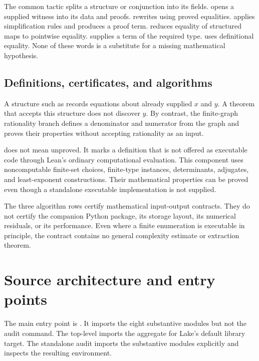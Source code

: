 The common  tactic splits a structure or conjunction into its fields.  opens a supplied witness into its data and proofs.  rewrites using proved equalities.  applies simplification rules and produces a proof term.  reduces equality of structured maps to pointwise equality.  supplies a term of the required type.  uses definitional equality. None of these words is a substitute for a missing mathematical hypothesis.

\subsection{Definitions, certificates, and algorithms}

A structure such as  records equations about already supplied $x$ and $y$. A theorem that accepts this structure does not discover $y$. By contrast, the finite-graph rationality branch defines a denominator and numerator from the graph and proves their properties without accepting rationality as an input.

 does not mean unproved. It marks a definition that is not offered as executable code through Lean's ordinary computational evaluation. This component uses noncomputable finite-set choices, finite-type instances, determinants, adjugates, and least-exponent constructions. Their mathematical properties can be proved even though a standalone executable implementation is not supplied.

The three algorithm rows certify mathematical input-output contracts. They do not certify the companion Python package, its storage layout, its numerical residuals, or its performance. Even where a finite enumeration is executable in principle, the contract contains no general complexity estimate or extraction theorem.

\section{Source architecture and entry points}\label{sec:architecture}

The main entry point is . It imports the eight substantive modules but not the audit command. The top-level  imports the aggregate for Lake's default library target. The standalone audit imports the substantive modules explicitly and inspects the resulting environment.

